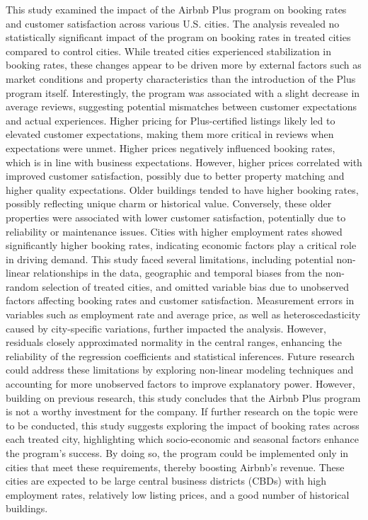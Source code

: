 \documentclass[
  12pt,
]{article}
\begin{document}
This study examined the impact of the Airbnb Plus program on booking
rates and customer satisfaction across various U.S. cities. The analysis
revealed no statistically significant impact of the program on booking
rates in treated cities compared to control cities. While treated cities
experienced stabilization in booking rates, these changes appear to be
driven more by external factors such as market conditions and property
characteristics than the introduction of the Plus program itself.
Interestingly, the program was associated with a slight decrease in
average reviews, suggesting potential mismatches between customer
expectations and actual experiences. Higher pricing for Plus-certified
listings likely led to elevated customer expectations, making them more
critical in reviews when expectations were unmet. Higher prices
negatively influenced booking rates, which is in line with business
expectations. However, higher prices correlated with improved customer
satisfaction, possibly due to better property matching and higher
quality expectations. Older buildings tended to have higher booking
rates, possibly reflecting unique charm or historical value. Conversely,
these older properties were associated with lower customer satisfaction,
potentially due to reliability or maintenance issues. Cities with higher
employment rates showed significantly higher booking rates, indicating
economic factors play a critical role in driving demand. This study
faced several limitations, including potential non-linear relationships
in the data, geographic and temporal biases from the non-random
selection of treated cities, and omitted variable bias due to unobserved
factors affecting booking rates and customer satisfaction. Measurement
errors in variables such as employment rate and average price, as well
as heteroscedasticity caused by city-specific variations, further
impacted the analysis. However, residuals closely approximated normality
in the central ranges, enhancing the reliability of the regression
coefficients and statistical inferences. Future research could address
these limitations by exploring non-linear modeling techniques and
accounting for more unobserved factors to improve explanatory power.
However, building on previous research, this study concludes that the
Airbnb Plus program is not a worthy investment for the company. If
further research on the topic were to be conducted, this study suggests
exploring the impact of booking rates across each treated city,
highlighting which socio-economic and seasonal factors enhance the
program's success. By doing so, the program could be implemented only in
cities that meet these requirements, thereby boosting Airbnb's revenue.
These cities are expected to be large central business districts (CBDs)
with high employment rates, relatively low listing prices, and a good
number of historical buildings.
\end{document}
